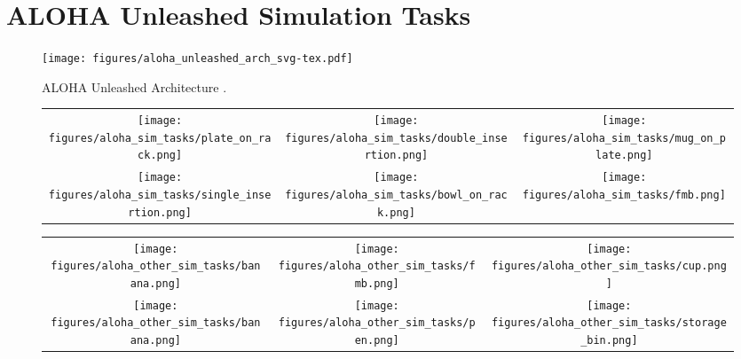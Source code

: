 \section{ALOHA Unleashed Simulation Tasks} \label{app:aloha}
\begin{figure*}
\centering
\texttt{[image: figures/aloha\_unleashed\_arch\_svg-tex.pdf]}
\caption{ALOHA Unleashed Architecture \citep{zhao2024aloha}.}
\label{fig:aloha_unleashed_arch}
\end{figure*}
\begin{figure*}[ht]
\centering
\setlength\tabcolsep{2pt}%
\begin{tabular}{ccc}

\texttt{[image: figures/aloha\_sim\_tasks/plate\_on\_rack.png]} & \texttt{[image: figures/aloha\_sim\_tasks/double\_insertion.png]} & \texttt{[image: figures/aloha\_sim\_tasks/mug\_on\_plate.png]} \\
 \texttt{[image: figures/aloha\_sim\_tasks/single\_insertion.png]} &   \texttt{[image: figures/aloha\_sim\_tasks/bowl\_on\_rack.png]} & \texttt{[image: figures/aloha\_sim\_tasks/fmb.png]} \\
\end{tabular}
\label{fig:aloha_sim_tasks}
\end{figure*}
\begin{figure*}
\centering
\setlength\tabcolsep{2pt}%
\begin{tabular}{ccc}
\texttt{[image: figures/aloha\_other\_sim\_tasks/banana.png]} & \texttt{[image: figures/aloha\_other\_sim\_tasks/fmb.png]} & \texttt{[image: figures/aloha\_other\_sim\_tasks/cup.png]} \\
 \texttt{[image: figures/aloha\_other\_sim\_tasks/banana.png]} &   \texttt{[image: figures/aloha\_other\_sim\_tasks/pen.png]} & \texttt{[image: figures/aloha\_other\_sim\_tasks/storage\_bin.png]} \\
\end{tabular}
\label{fig:aloha_other_sim_tasks}
\end{figure*}
